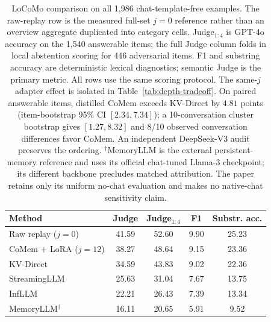 \begin{table}[!t]
\centering
\small
\setlength{\tabcolsep}{4pt}
\begin{tabular}{@{}lcccc@{}}
\toprule
\textbf{Method} & \textbf{Judge} & \textbf{Judge$_{1:4}$} & \textbf{F1} & \textbf{Substr. acc.} \\
\midrule
Raw replay ($j{=}0$) & 41.59 & 52.60 & 9.90 & 25.23 \\
CoMem + LoRA ($j{=}12$) & 38.27 & 48.64 & 9.15 & 23.36 \\
KV-Direct & 34.59 & 43.83 & 9.02 & 22.36 \\
StreamingLLM & 25.63 & 31.04 & 7.67 & 13.75 \\
InfLLM & 22.21 & 26.43 & 7.39 & 13.34 \\
MemoryLLM$^{\dagger}$ & 16.11 & 20.65 & 5.91 & 9.52 \\
\bottomrule
\end{tabular}
\caption{LoCoMo comparison on all 1,986 chat-template-free examples. The
raw-replay row is the measured full-set $j{=}0$ reference rather than an
overview aggregate duplicated into category cells.
Judge$_{1:4}$ is GPT-4o accuracy on the 1,540 answerable items; the full Judge
column folds in local abstention scoring for 446 adversarial items. F1 and
substring accuracy are deterministic lexical diagnostics; semantic Judge is the
primary metric. All rows use the same scoring protocol. The same-$j$ adapter effect is isolated in
Table~\ref{tab:depth-tradeoff}. On paired answerable items, distilled CoMem
exceeds KV-Direct by $4.81$ points (item-bootstrap 95\% CI $[2.34,7.34]$);
a 10-conversation cluster bootstrap gives $[1.27,8.32]$ and 8/10 observed
conversation differences favor CoMem. An independent DeepSeek-V3 audit
preserves the ordering.
$^{\dagger}$MemoryLLM is the external persistent-memory reference and uses its
official chat-tuned Llama-3 checkpoint; its different backbone precludes matched
attribution. The paper retains only its uniform no-chat evaluation and makes no
native-chat sensitivity claim.}
\label{tab:locomo}
\end{table}
